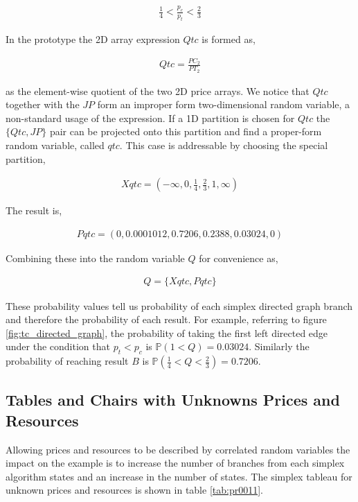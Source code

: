 \begin{align*}
\frac{1}{4} < \frac{p_c}{p_t} < \frac{2}{3}
\end{align*}

In the prototype the 2D array expression $Qtc$ is formed as,

\begin{align*}
Qtc = \frac{PC_2}{PT_2}
\end{align*}

as the element-wise quotient of the two 2D price arrays. We notice that $Qtc$ together with the $JP$ form an improper form two-dimensional random variable, a non-standard usage of the expression. If a 1D partition is chosen for $Qtc$ the $\{Qtc, JP\}$ pair can be projected onto this partition and find a proper-form random variable, called $qtc$. This case is addressable by choosing the special partition,

\begin{align*}
Xqtc = (-\infty, 0, \frac{1}{4}, \frac{2}{3}, 1, \infty)
\end{align*}

The result is,

\begin{align*}
Pqtc = (0, 0.0001012, 0.7206, 0.2388, 0.03024, 0)
\end{align*}

Combining these into the random variable $Q$ for convenience as,

\begin{align*}
Q = \{Xqtc, Pqtc\}
\end{align*}

These probability values tell us probability of each simplex directed graph branch and therefore the probability of each result. For example, referring to figure \ref{fig:tc_directed_graph}, the probability of taking the first left directed edge under the condition that $p_t < p_c$ is  $\mathbb{P}(1 < Q) = 0.03024$. Similarly the probability of reaching result $B$ is $\mathbb{P}(\frac{1}{4} < Q < \frac{2}{3}) = 0.7206$.

\subsection{Tables and Chairs with Unknowns Prices and Resources}

Allowing prices and resources to be described by correlated random variables the impact on the example is to increase the number of branches from each simplex algorithm states and an increase in the number of states. The simplex tableau for unknown prices and resources is shown in table \ref{tab:pr0011}. 

